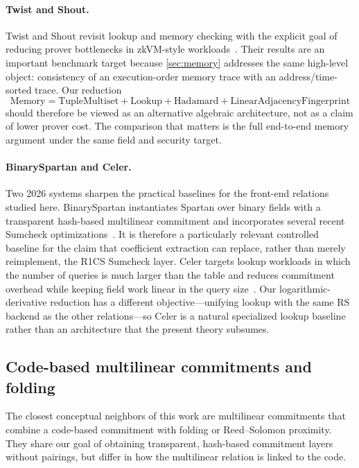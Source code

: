 \paragraph{Twist and Shout.}
Twist and Shout revisit lookup and memory checking with the explicit goal of reducing prover bottlenecks in zkVM-style workloads~\cite{TwistShout26}.  Their results are an important benchmark target because \cref{sec:memory} addresses the same high-level object: consistency of an execution-order memory trace with an address/time-sorted trace.  Our reduction
\[
  \mathrm{Memory}
  =
  \mathrm{TupleMultiset}
  +\mathrm{Lookup}
  +\mathrm{Hadamard}
  +\mathrm{LinearAdjacencyFingerprint}
\]
should therefore be viewed as an alternative algebraic architecture, not as a claim of lower prover cost.  The comparison that matters is the full end-to-end memory argument under the same field and security target.

\paragraph{BinarySpartan and Celer.}
Two 2026 systems sharpen the practical baselines for the front-end relations studied here.  BinarySpartan instantiates Spartan over binary fields with a transparent hash-based multilinear commitment and incorporates several recent Sumcheck optimizations~\cite{BinarySpartan26}.  It is therefore a particularly relevant controlled baseline for the claim that coefficient extraction can replace, rather than merely reimplement, the R1CS Sumcheck layer.  Celer targets lookup workloads in which the number of queries is much larger than the table and reduces commitment overhead while keeping field work linear in the query size~\cite{Celer26}.  Our logarithmic-derivative reduction has a different objective---unifying lookup with the same RS backend as the other relations---so Celer is a natural specialized lookup baseline rather than an architecture that the present theory subsumes.

\subsection{Code-based multilinear commitments and folding}
\label{sec:comparison-code-mlpcs}

The closest conceptual neighbors of this work are multilinear commitments that combine a code-based commitment with folding or Reed--Solomon proximity.  They share our goal of obtaining transparent, hash-based commitment layers without pairings, but differ in how the multilinear relation is linked to the code.

